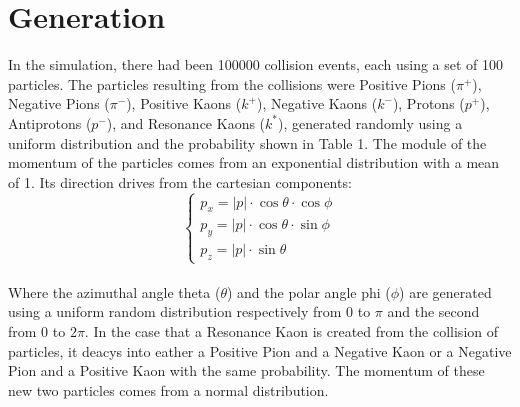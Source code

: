 \documentclass[a4paper, 11pt]{article}
\begin{document}
    \section{Generation}
      In the simulation, there had been 100000 collision events, each using a set of 100 particles. The particles resulting from the collisions were Positive Pions ($\pi^+$), Negative Pions ($\pi^-$), Positive Kaons ($k^+$), Negative Kaons ($k^-$), Protons ($p^+$), Antiprotons ($p^-$), and Resonance Kaons ($k^*$), generated randomly using a uniform distribution and the probability shown in Table 1.  The module of the momentum of the particles comes from an exponential distribution with a mean of 1. Its direction drives from the cartesian components:
      \begin{equation}
        \begin{cases}
          p_x = |p| \cdot \cos \theta \cdot \cos \phi\\
          p_y = |p| \cdot \cos \theta \cdot \sin \phi\\
          p_z = |p| \cdot \sin \theta
        \end{cases}
      \end{equation}\\
      Where the azimuthal angle theta ($\theta$) and the polar angle phi ($\phi$) are generated using a uniform random distribution respectively from 0 to $\pi$ and the second from 0 to $2\pi$.
      In the case that a Resonance Kaon is created from the collision of particles, it deacys into eather a Positive Pion and a Negative Kaon or a Negative Pion and a Positive Kaon with the same probability. The momentum of these new two particles comes from a normal distribution.
\end{document}
